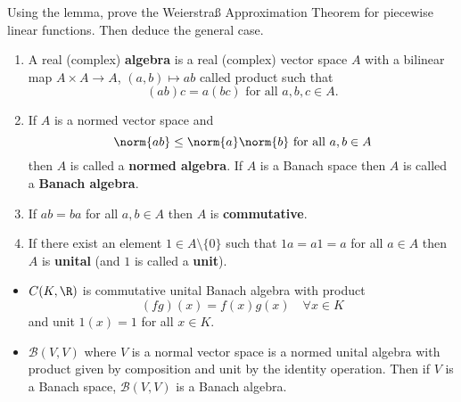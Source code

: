 \documentclass{article}
\begin{document}
\begin{ex}
    Using the lemma, prove the Weierstra{\ss} Approximation Theorem for piecewise linear functions. Then deduce the general case.
\end{ex}

\begin{defi}
    \begin{enumerate}[label=(\roman*)]
        \item A real (complex) \textbf{algebra} is a real (complex) vector space $A$ with a bilinear map $A \times A \to A$, $(a, b) \mapsto ab$ called product such that
            \begin{equation*}
                (ab)c = a(bc) \text{ for all } a, b, c \in A \tag{(associativity)}.
            \end{equation*}
        \item If $A$ is a normed vector space and
            \begin{equation*}
                \norm{ab} \leq \norm{a} \norm{b} \text{ for all } a, b \in A
            \end{equation*}
            then $A$ is called a \textbf{normed algebra}.
            If $A$ is a Banach space then $A$ is called a \textbf{Banach algebra}.
        \item If $ab=ba$ for all $a,b  \in A$ then $A$ is \textbf{commutative}.
        \item If there exist an element $1 \in A \setminus \{0\}$ such that $1a =a1=a$ for all $a \in A$ then $A$ is \textbf{unital} (and $1$ is called a \textbf{unit}).
    \end{enumerate}
\end{defi}

\begin{eg}
    \begin{itemize}
        \item $C(K, \R)$ is commutative unital Banach algebra with product
            \begin{equation*}
                (fg)(x) = f(x) g(x) \quad \forall x \in K
            \end{equation*}
            and unit $1(x) = 1$ for all $x \in K$.
        \item $\mathcal{B}(V, V)$ where $V$ is a normal vector space is a normed unital algebra with product given by composition and unit by the identity operation.
            Then if $V$ is a Banach space, $\mathcal{B}(V, V)$ is a Banach algebra.
    \end{itemize}
\end{eg}
\end{document}
